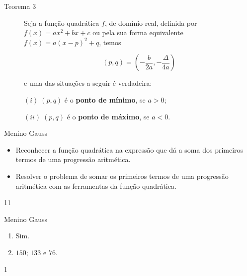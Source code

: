 \begin{description}
\item[Teorema 3]

Seja a função quadrática \(f\), de domínio real, definida por  \(f(x)=ax^2+bx+c\) ou pela sua forma equivalente \(f(x)=a(x-p)^2+q\), temos 

$$(p,q)= \left( -\frac{b}{2a}, -\frac{\Delta}{4a} \right)$$

e uma das situações a seguir é verdadeira:

\((i)\;(p,q)\) é o \textbf{ponto de mínimo}, se \(a>0\);

\((ii)\;(p,q)\) é o \textbf{ponto de máximo}, se \(a<0\).
\end{description}

\clearpage
\def\currentcolor{session3}
\begin{objectives}{Menino Gauss}
{
  \begin{itemize}
  \item Reconhecer a função quadrática na expressão que dá a soma dos primeiros termos de uma progressão aritmética.
  \item Resolver o problema de somar os primeiros termos de uma progressão aritmética com as ferramentas da função quadrática.
  \end{itemize}
}{1}{1}
\end{objectives}
\begin{answer}{Menino Gauss}
{
\begin{enumerate}
\item {} 
Sim.

\item {} 
\(150\); \(133\) e \(76\).
\end{enumerate}
}{1}
\end{answer}
\clearmargin
